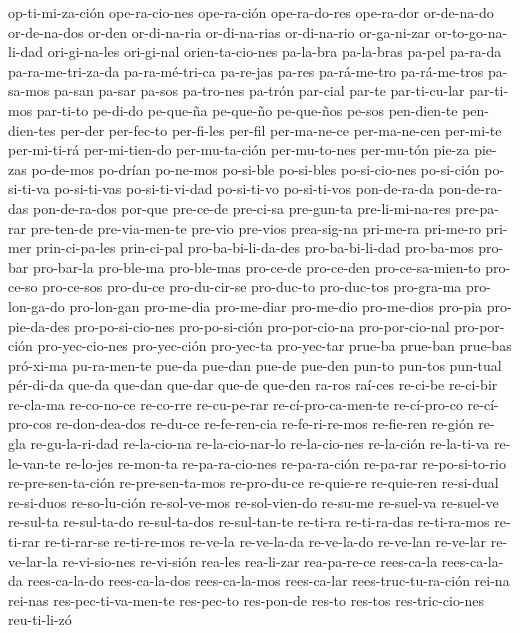 {op-ti-mi-za-ción ope-ra-cio-nes ope-ra-ción ope-ra-do-res ope-ra-dor or-de-na-do
or-de-na-dos or-den or-di-na-ria or-di-na-rias or-di-na-rio or-ga-ni-zar or-to-go-na-li-dad
ori-gi-na-les ori-gi-nal orien-ta-cio-nes pa-la-bra pa-la-bras pa-pel pa-ra-da
pa-ra-me-tri-za-da pa-ra-mé-tri-ca pa-re-jas pa-res pa-rá-me-tro pa-rá-me-tros pa-sa-mos
pa-san pa-sar pa-sos pa-tro-nes pa-trón par-cial par-te par-ti-cu-lar par-ti-mos par-ti-to
pe-di-do pe-que-ña pe-que-ño pe-que-ños pe-sos pen-dien-te pen-dien-tes per-der per-fec-to
per-fi-les per-fil per-ma-ne-ce per-ma-ne-cen per-mi-te per-mi-ti-rá per-mi-tien-do
per-mu-ta-ción per-mu-to-nes per-mu-tón pie-za pie-zas po-de-mos po-drían po-ne-mos
po-si-ble po-si-bles po-si-cio-nes po-si-ción po-si-ti-va po-si-ti-vas po-si-ti-vi-dad
po-si-ti-vo po-si-ti-vos pon-de-ra-da pon-de-ra-das pon-de-ra-dos por-que pre-ce-de
pre-ci-sa pre-gun-ta pre-li-mi-na-res pre-pa-rar pre-ten-de pre-via-men-te pre-vio pre-vios
prea-sig-na pri-me-ra pri-me-ro pri-mer prin-ci-pa-les prin-ci-pal pro-ba-bi-li-da-des
pro-ba-bi-li-dad pro-ba-mos pro-bar pro-bar-la pro-ble-ma pro-ble-mas pro-ce-de pro-ce-den
pro-ce-sa-mien-to pro-ce-so pro-ce-sos pro-du-ce pro-du-cir-se pro-duc-to pro-duc-tos
pro-gra-ma pro-lon-ga-do pro-lon-gan pro-me-dia pro-me-diar pro-me-dio pro-me-dios pro-pia
pro-pie-da-des pro-po-si-cio-nes pro-po-si-ción pro-por-cio-na pro-por-cio-nal pro-por-ción
pro-yec-cio-nes pro-yec-ción pro-yec-ta pro-yec-tar prue-ba prue-ban prue-bas pró-xi-ma
pu-ra-men-te pue-da pue-dan pue-de pue-den pun-to pun-tos pun-tual pér-di-da que-da que-dan
que-dar que-de que-den ra-ros raí-ces re-ci-be re-ci-bir re-cla-ma re-co-no-ce re-co-rre
re-cu-pe-rar re-cí-pro-ca-men-te re-cí-pro-co re-cí-pro-cos re-don-dea-dos re-du-ce
re-fe-ren-cia re-fe-ri-re-mos re-fie-ren re-gión re-gla re-gu-la-ri-dad re-la-cio-na
re-la-cio-nar-lo re-la-cio-nes re-la-ción re-la-ti-va re-le-van-te re-lo-jes re-mon-ta
re-pa-ra-cio-nes re-pa-ra-ción re-pa-rar re-po-si-to-rio re-pre-sen-ta-ción
re-pre-sen-ta-mos re-pro-du-ce re-quie-re re-quie-ren re-si-dual re-si-duos re-so-lu-ción
re-sol-ve-mos re-sol-vien-do re-su-me re-suel-va re-suel-ve re-sul-ta re-sul-ta-do
re-sul-ta-dos re-sul-tan-te re-ti-ra re-ti-ra-das re-ti-ra-mos re-ti-rar re-ti-rar-se
re-ti-re-mos re-ve-la re-ve-la-da re-ve-la-do re-ve-lan re-ve-lar re-ve-lar-la re-vi-sio-nes
re-vi-sión rea-les rea-li-zar rea-pa-re-ce rees-ca-la rees-ca-la-da rees-ca-la-do
rees-ca-la-dos rees-ca-la-mos rees-ca-lar rees-truc-tu-ra-ción rei-na rei-nas
res-pec-ti-va-men-te res-pec-to res-pon-de res-to res-tos res-tric-cio-nes reu-ti-li-zó
}
